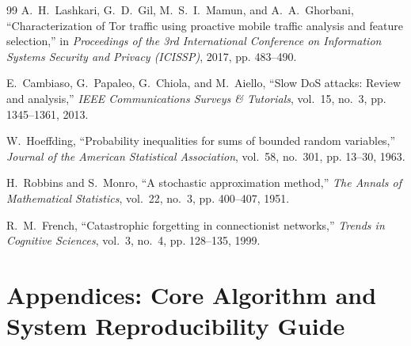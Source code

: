 \documentclass[12pt,a4paper,oneside]{report}
\begin{document}
\begin{thebibliography}{99}
A.~H.~Lashkari, G.~D.~Gil, M.~S.~I.~Mamun, and A.~A.~Ghorbani, ``Characterization of Tor traffic using proactive mobile traffic analysis and feature selection,'' in \textit{Proceedings of the 3rd International Conference on Information Systems Security and Privacy (ICISSP)}, 2017, pp. 483--490.

E.~Cambiaso, G.~Papaleo, G.~Chiola, and M.~Aiello, ``Slow DoS attacks: Review and analysis,'' \textit{IEEE Communications Surveys \& Tutorials}, vol.~15, no.~3, pp. 1345--1361, 2013.

W.~Hoeffding, ``Probability inequalities for sums of bounded random variables,'' \textit{Journal of the American Statistical Association}, vol.~58, no.~301, pp. 13--30, 1963.

H.~Robbins and S.~Monro, ``A stochastic approximation method,'' \textit{The Annals of Mathematical Statistics}, vol.~22, no.~3, pp. 400--407, 1951.

R.~M.~French, ``Catastrophic forgetting in connectionist networks,'' \textit{Trends in Cognitive Sciences}, vol.~3, no.~4, pp. 128--135, 1999.

\end{thebibliography}


\appendix

\chapter{Appendices: Core Algorithm and System Reproducibility Guide}
\label{app:guide}
\label{app:code}
\end{document}
